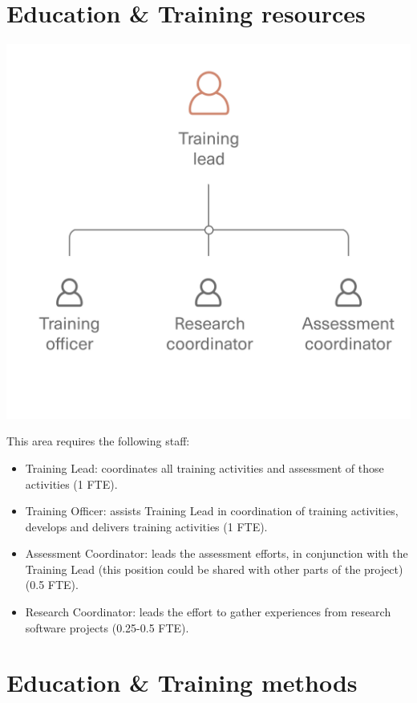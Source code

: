 \documentclass[
]{book}
\begin{document}
\hypertarget{education-training-resources}{%
\section{Education \& Training resources}\label{education-training-resources}}

\includegraphics{images/education_structure.png}

This area requires the following staff:

\begin{itemize}
\item
  Training Lead: coordinates all training activities and assessment of those
  activities (1 FTE).
\item
  Training Officer: assists Training Lead in coordination of training activities,
  develops and delivers training activities (1 FTE).
\item
  Assessment Coordinator: leads the assessment efforts, in conjunction with the Training
  Lead (this position could be shared with other parts of the project) (0.5 FTE).
\item
  Research Coordinator: leads the effort to gather experiences from research
  software projects (0.25-0.5 FTE).
\end{itemize}

\hypertarget{education-training-methods}{%
\section{Education \& Training methods}\label{education-training-methods}}
\end{document}
